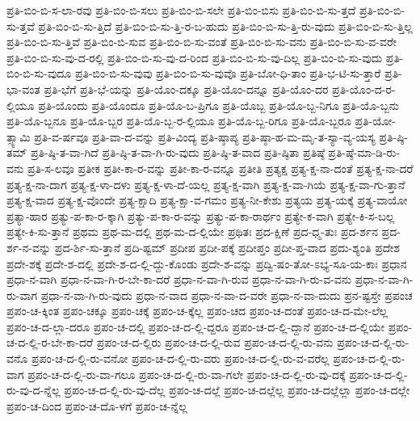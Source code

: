{ಪ್ರತಿ-ಬಿಂ-ಬಿ-ಸ-ಲಾ-ರವು
ಪ್ರತಿ-ಬಿಂ-ಬಿ-ಸಲು
ಪ್ರತಿ-ಬಿಂ-ಬಿ-ಸಲೇ
ಪ್ರತಿ-ಬಿಂ-ಬಿಸು
ಪ್ರತಿ-ಬಿಂ-ಬಿ-ಸು-ತ್ತದೆ
ಪ್ರತಿ-ಬಿಂ-ಬಿ-ಸು-ತ್ತವೆ
ಪ್ರತಿ-ಬಿಂ-ಬಿ-ಸು-ತ್ತಿದೆ
ಪ್ರತಿ-ಬಿಂ-ಬಿ-ಸು-ತ್ತಿ-ರ-ಬ-ಹುದು
ಪ್ರತಿ-ಬಿಂ-ಬಿ-ಸು-ತ್ತಿ-ರು-ವುದು
ಪ್ರತಿ-ಬಿಂ-ಬಿ-ಸು-ತ್ತಿಲ್ಲ
ಪ್ರತಿ-ಬಿಂ-ಬಿ-ಸು-ತ್ತಿವೆ
ಪ್ರತಿ-ಬಿಂ-ಬಿ-ಸುವ
ಪ್ರತಿ-ಬಿಂ-ಬಿ-ಸು-ವಂತೆ
ಪ್ರತಿ-ಬಿಂ-ಬಿ-ಸು-ವನು
ಪ್ರತಿ-ಬಿಂ-ಬಿ-ಸು-ವ-ವರೇ
ಪ್ರತಿ-ಬಿಂ-ಬಿ-ಸು-ವು-ದ-ರಲ್ಲಿ
ಪ್ರತಿ-ಬಿಂ-ಬಿ-ಸು-ವು-ದ-ರಿಂದ
ಪ್ರತಿ-ಬಿಂ-ಬಿ-ಸು-ವು-ದಿಲ್ಲ
ಪ್ರತಿ-ಬಿಂ-ಬಿ-ಸು-ವುದು
ಪ್ರತಿ-ಬಿಂ-ಬಿ-ಸು-ವುದೂ
ಪ್ರತಿ-ಬಿಂ-ಬಿ-ಸು-ವುವು
ಪ್ರತಿ-ಬಿಂ-ಬಿ-ಸು-ವುವೊ
ಪ್ರತಿ-ಬೋ-ಧಿ-ತಾಂ
ಪ್ರತಿ-ಭ-ಟಿ-ಸು-ತ್ತಾರೆ
ಪ್ರತಿ-ಭಾ-ವಂತ
ಪ್ರತಿ-ಭೆಗೆ
ಪ್ರತಿ-ಭೆ-ಯನ್ನು
ಪ್ರತಿ-ಯೊಂ-ದಕ್ಕೂ
ಪ್ರತಿ-ಯೊಂ-ದನ್ನೂ
ಪ್ರತಿ-ಯೊಂ-ದರ
ಪ್ರತಿ-ಯೊಂ-ದ-ರ-ಲ್ಲಿಯೂ
ಪ್ರತಿ-ಯೊಂದು
ಪ್ರತಿ-ಯೊಂದೂ
ಪ್ರತಿ-ಯೊ-ಬ-ಪ್ರಿಗೂ
ಪ್ರತಿ-ಯೊಬ್ಬ
ಪ್ರತಿ-ಯೊ-ಬ್ಬ-ನಿಗೂ
ಪ್ರತಿ-ಯೊ-ಬ್ಬನು
ಪ್ರತಿ-ಯೊ-ಬ್ಬನೂ
ಪ್ರತಿ-ಯೊ-ಬ್ಬರ
ಪ್ರತಿ-ಯೊ-ಬ್ಬ-ರ-ಲ್ಲಿಯೂ
ಪ್ರತಿ-ಯೊ-ಬ್ಬ-ರಿಗೂ
ಪ್ರತಿ-ಯೊ-ಬ್ಬರೂ
ಪ್ರತಿ-ಯೋ-ತ್ಸ್ಯಾಮಿ
ಪ್ರತಿ-ವ-ರ್ಷವೂ
ಪ್ರತಿ-ವಾ-ದ-ವನ್ನು
ಪ್ರತಿ-ವಿಂದ್ಯ
ಪ್ರತಿ-ಷ್ಠಾಪ್ಯ
ಪ್ರತಿ-ಷ್ಠಾ-ಹ-ಮ-ಮೃ-ತ-ಸ್ಯಾ-ವ್ಯ-ಯಸ್ಯ
ಪ್ರತಿ-ಷ್ಠಿ-ತಮ್
ಪ್ರತಿ-ಷ್ಠಿ-ತ-ವಾ-ಗಿದೆ
ಪ್ರತಿ-ಷ್ಠಿ-ತ-ವಾ-ಗಿ-ರು-ವುದು
ಪ್ರತಿ-ಷ್ಠಿ-ತ-ವಾದ
ಪ್ರತಿ-ಷ್ಠಿತಾ
ಪ್ರತಿಷ್ಠೆ
ಪ್ರತಿ-ಷ್ಠೆ-ಮಾ-ಡಿ-ರು-ವನು
ಪ್ರತಿ-ಸ-ಲವೂ
ಪ್ರತೀಕ
ಪ್ರತೀ-ಕಾ-ರ-ವನ್ನು
ಪ್ರತೀ-ಕಾ-ರ-ವನ್ನೂ
ಪ್ರತೀತಿ
ಪ್ರತ್ಯಕ್ಷ
ಪ್ರತ್ಯ-ಕ್ಷ-ನಾ-ದಂತೆ
ಪ್ರತ್ಯ-ಕ್ಷ-ನಾ-ದರೆ
ಪ್ರತ್ಯ-ಕ್ಷ-ನಾ-ದಾಗ
ಪ್ರತ್ಯ-ಕ್ಷ-ಳಾ-ದಳು
ಪ್ರತ್ಯ-ಕ್ಷ-ಳಾ-ದೆ-ಯಲ್ಲ
ಪ್ರತ್ಯ-ಕ್ಷ-ವಾಗಿ
ಪ್ರತ್ಯ-ಕ್ಷ-ವಾ-ಗಿಯೆ
ಪ್ರತ್ಯ-ಕ್ಷ-ವಾ-ಗು-ತ್ತಾನೆ
ಪ್ರತ್ಯ-ಕ್ಷ-ವಾದ
ಪ್ರತ್ಯ-ಕ್ಷ-ವೊಂದೇ
ಪ್ರತ್ಯ-ಕ್ಷಾದಿ
ಪ್ರತ್ಯ-ಕ್ಷಾ-ವ-ಗಮಂ
ಪ್ರತ್ಯ-ನೀ-ಕೇಶು
ಪ್ರತ್ಯಯ
ಪ್ರತ್ಯ-ಯಕ್ಕೆ
ಪ್ರತ್ಯ-ವಾಯೋ
ಪ್ರತ್ಯಾ-ಹಾರ
ಪ್ರತ್ಯು-ಪ-ಕಾ-ರ-ಕ್ಕಾಗಿ
ಪ್ರತ್ಯು-ಪ-ಕಾ-ರ-ವನ್ನು
ಪ್ರತ್ಯು-ಪ-ಕಾ-ರಾರ್ಥಂ
ಪ್ರತ್ಯೇ-ಕ-ವಾಗಿ
ಪ್ರತ್ಯೇ-ಕಿ-ಸ-ಬಲ್ಲ
ಪ್ರತ್ಯೇ-ಕಿ-ಸು-ತ್ತಾನೆ
ಪ್ರಥಮ
ಪ್ರಥ-ಮ-ದಲ್ಲಿ
ಪ್ರಥ-ಮ-ದ-ಲ್ಲಿಯೇ
ಪ್ರಥಿತಃ
ಪ್ರದ-ಕ್ಷಿಣೆ
ಪ್ರದ-ಧ್ಮ-ತುಃ
ಪ್ರದ-ರ್ಶನ
ಪ್ರದ-ರ್ಶ-ನ-ವನ್ನು
ಪ್ರದ-ರ್ಶಿ-ಸು-ತ್ತಾನೆ
ಪ್ರದಿ-ಷ್ಟಮ್
ಪ್ರದೀಪ
ಪ್ರದೀ-ಪಕ್ಕೆ
ಪ್ರದೀಪ್ತಂ
ಪ್ರದೀ-ಪ್ತ-ವಾದ
ಪ್ರದು-ಶ್ಯಂತಿ
ಪ್ರದೇಶ
ಪ್ರದೇ-ಶಕ್ಕೆ
ಪ್ರದೇ-ಶ-ದಲ್ಲಿ
ಪ್ರದೇ-ಶ-ದ-ಲ್ಲಿ-ದ್ದು-ಕೊಂಡು
ಪ್ರದೇ-ಶ-ವನ್ನು
ಪ್ರದ್ವಿ-ಷಂ-ತೋ-ಽಭ್ಯ-ಸೂ-ಯ-ಕಾಃ
ಪ್ರಧಾನ
ಪ್ರಧಾ-ನ-ವಾಗಿ
ಪ್ರಧಾ-ನ-ವಾ-ಗಿ-ರ-ಬೇ-ಕಾ-ದರೆ
ಪ್ರಧಾ-ನ-ವಾ-ಗಿ-ರುವ
ಪ್ರಧಾ-ನ-ವಾ-ಗಿ-ರು-ವ-ವನು
ಪ್ರಧಾ-ನ-ವಾ-ಗಿ-ರು-ವಾಗ
ಪ್ರಧಾ-ನ-ವಾ-ಗಿ-ರು-ವುದು
ಪ್ರಧಾ-ನ-ವಾದ
ಪ್ರಧಾ-ನ-ವಾ-ದ-ವರೇ
ಪ್ರಧಾ-ನ-ವಾ-ದುದು
ಪ್ರನ-ಷ್ಟಸ್ತೇ
ಪ್ರಪಂಚ
ಪ್ರಪಂ-ಚ-ಕ್ಕಿಂತ
ಪ್ರಪಂ-ಚಕ್ಕೂ
ಪ್ರಪಂ-ಚಕ್ಕೆ
ಪ್ರಪಂ-ಚ-ಕ್ಕೆಲ್ಲ
ಪ್ರಪಂ-ಚದ
ಪ್ರಪಂ-ಚ-ದಂತೆ
ಪ್ರಪಂ-ಚ-ದ-ಮೇ-ಲೆಲ್ಲ
ಪ್ರಪಂ-ಚ-ದ-ಲ್ಲಾ-ದರೂ
ಪ್ರಪಂ-ಚ-ದಲ್ಲಿ
ಪ್ರಪಂ-ಚ-ದ-ಲ್ಲಿ-ದ್ದರೂ
ಪ್ರಪಂ-ಚ-ದ-ಲ್ಲಿ-ದ್ದಾನೆ
ಪ್ರಪಂ-ಚ-ದ-ಲ್ಲಿಯೇ
ಪ್ರಪಂ-ಚ-ದ-ಲ್ಲಿ-ರ-ಬೇ-ಕಾ-ದರೆ
ಪ್ರಪಂ-ಚ-ದ-ಲ್ಲಿರು
ಪ್ರಪಂ-ಚ-ದ-ಲ್ಲಿ-ರುವ
ಪ್ರಪಂ-ಚ-ದ-ಲ್ಲಿ-ರು-ವನು
ಪ್ರಪಂ-ಚ-ದ-ಲ್ಲಿ-ರು-ವನೊ
ಪ್ರಪಂ-ಚ-ದ-ಲ್ಲಿ-ರು-ವನೋ
ಪ್ರಪಂ-ಚ-ದ-ಲ್ಲಿ-ರು-ವರು
ಪ್ರಪಂ-ಚ-ದ-ಲ್ಲಿ-ರು-ವ-ವರೆಲ್ಲ
ಪ್ರಪಂ-ಚ-ದ-ಲ್ಲಿ-ರು-ವಾಗ
ಪ್ರಪಂ-ಚ-ದ-ಲ್ಲಿ-ರು-ವಾ-ಗಲೂ
ಪ್ರಪಂ-ಚ-ದ-ಲ್ಲಿ-ರು-ವಾ-ಗಲೇ
ಪ್ರಪಂ-ಚ-ದ-ಲ್ಲಿ-ರು-ವು-ದಕ್ಕೆ
ಪ್ರಪಂ-ಚ-ದ-ಲ್ಲಿ-ರು-ವು-ದ-ನ್ನೆಲ್ಲ
ಪ್ರಪಂ-ಚ-ದ-ಲ್ಲಿ-ರು-ವು-ದೆಲ್ಲ
ಪ್ರಪಂ-ಚ-ದಲ್ಲೆ
ಪ್ರಪಂ-ಚ-ದಲ್ಲೆಲ್ಲ
ಪ್ರಪಂ-ಚ-ದಲ್ಲೆಲ್ಲಾ
ಪ್ರಪಂ-ಚ-ದಲ್ಲೇ
ಪ್ರಪಂ-ಚ-ದಿಂದ
ಪ್ರಪಂ-ಚ-ದೊ-ಳಗೆ
ಪ್ರಪಂ-ಚ-ನ್ನೆಲ್ಲ
}

